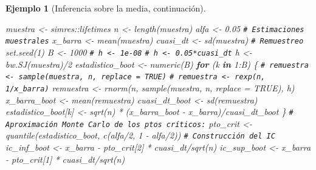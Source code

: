 \documentclass[
  10pt,
]{book}
\newenvironment{Shaded}{\begin{snugshade}}{\end{snugshade}}
\newcommand{\AttributeTok}[1]{\textcolor[rgb]{0.77,0.63,0.00}{#1}}
\newcommand{\CommentTok}[1]{\textcolor[rgb]{0.56,0.35,0.01}{\textit{#1}}}
\newcommand{\ConstantTok}[1]{\textcolor[rgb]{0.00,0.00,0.00}{#1}}
\newcommand{\ControlFlowTok}[1]{\textcolor[rgb]{0.13,0.29,0.53}{\textbf{#1}}}
\newcommand{\DecValTok}[1]{\textcolor[rgb]{0.00,0.00,0.81}{#1}}
\newcommand{\FloatTok}[1]{\textcolor[rgb]{0.00,0.00,0.81}{#1}}
\newcommand{\FunctionTok}[1]{\textcolor[rgb]{0.00,0.00,0.00}{#1}}
\newcommand{\NormalTok}[1]{#1}
\newcommand{\OtherTok}[1]{\textcolor[rgb]{0.56,0.35,0.01}{#1}}
\newcommand{\SpecialCharTok}[1]{\textcolor[rgb]{0.00,0.00,0.00}{#1}}
\theoremstyle{break}
\newtheorem{example}{Ejemplo}[chapter]
\theoremstyle{nonumberplain}
\renewcommand{\CommentTok}[1]{\textcolor[rgb]{0.41,0.41,0.41}{\texttt{#1}}}
\begin{document}
\begin{example}[Inferencia sobre la media, continuación]
\begin{Shaded}
\begin{Highlighting}[]
\NormalTok{muestra }\OtherTok{\textless{}{-}}\NormalTok{ simres}\SpecialCharTok{::}\NormalTok{lifetimes}
\NormalTok{n }\OtherTok{\textless{}{-}} \FunctionTok{length}\NormalTok{(muestra)}
\NormalTok{alfa }\OtherTok{\textless{}{-}} \FloatTok{0.05}
\CommentTok{\# Estimaciones muestrales}
\NormalTok{x\_barra }\OtherTok{\textless{}{-}} \FunctionTok{mean}\NormalTok{(muestra)}
\NormalTok{cuasi\_dt }\OtherTok{\textless{}{-}} \FunctionTok{sd}\NormalTok{(muestra)}
\CommentTok{\# Remuestreo}
\FunctionTok{set.seed}\NormalTok{(}\DecValTok{1}\NormalTok{)}
\NormalTok{B }\OtherTok{\textless{}{-}} \DecValTok{1000}
\CommentTok{\# h \textless{}{-} 1e{-}08}
\CommentTok{\# h \textless{}{-} 0.05*cuasi\_dt}
\NormalTok{h }\OtherTok{\textless{}{-}} \FunctionTok{bw.SJ}\NormalTok{(muestra)}\SpecialCharTok{/}\DecValTok{2}
\NormalTok{estadistico\_boot }\OtherTok{\textless{}{-}} \FunctionTok{numeric}\NormalTok{(B)}
\ControlFlowTok{for}\NormalTok{ (k }\ControlFlowTok{in} \DecValTok{1}\SpecialCharTok{:}\NormalTok{B) \{}
  \CommentTok{\# remuestra \textless{}{-} sample(muestra, n, replace = TRUE)}
  \CommentTok{\# remuestra \textless{}{-} rexp(n, 1/x\_barra)}
\NormalTok{  remuestra }\OtherTok{\textless{}{-}} \FunctionTok{rnorm}\NormalTok{(n, }\FunctionTok{sample}\NormalTok{(muestra, n, }\AttributeTok{replace =} \ConstantTok{TRUE}\NormalTok{), h)}
\NormalTok{  x\_barra\_boot }\OtherTok{\textless{}{-}} \FunctionTok{mean}\NormalTok{(remuestra)}
\NormalTok{  cuasi\_dt\_boot }\OtherTok{\textless{}{-}} \FunctionTok{sd}\NormalTok{(remuestra)}
\NormalTok{  estadistico\_boot[k] }\OtherTok{\textless{}{-}} \FunctionTok{sqrt}\NormalTok{(n) }\SpecialCharTok{*}\NormalTok{ (x\_barra\_boot }\SpecialCharTok{{-}}\NormalTok{ x\_barra)}\SpecialCharTok{/}\NormalTok{cuasi\_dt\_boot}
\NormalTok{\}}
\CommentTok{\# Aproximación Monte Carlo de los ptos críticos:}
\NormalTok{pto\_crit }\OtherTok{\textless{}{-}} \FunctionTok{quantile}\NormalTok{(estadistico\_boot, }\FunctionTok{c}\NormalTok{(alfa}\SpecialCharTok{/}\DecValTok{2}\NormalTok{, }\DecValTok{1} \SpecialCharTok{{-}}\NormalTok{ alfa}\SpecialCharTok{/}\DecValTok{2}\NormalTok{))}
\CommentTok{\# Construcción del IC}
\NormalTok{ic\_inf\_boot }\OtherTok{\textless{}{-}}\NormalTok{ x\_barra }\SpecialCharTok{{-}}\NormalTok{ pto\_crit[}\DecValTok{2}\NormalTok{] }\SpecialCharTok{*}\NormalTok{ cuasi\_dt}\SpecialCharTok{/}\FunctionTok{sqrt}\NormalTok{(n)}
\NormalTok{ic\_sup\_boot }\OtherTok{\textless{}{-}}\NormalTok{ x\_barra }\SpecialCharTok{{-}}\NormalTok{ pto\_crit[}\DecValTok{1}\NormalTok{] }\SpecialCharTok{*}\NormalTok{ cuasi\_dt}\SpecialCharTok{/}\FunctionTok{sqrt}\NormalTok{(n)}

\end{Highlighting}
\end{Shaded}
\end{example}
\end{document}
